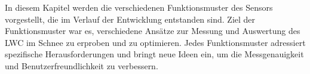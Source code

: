 
In diesem Kapitel werden die verschiedenen Funktionsmuster des Sensors vorgestellt, die im Verlauf der Entwicklung entstanden sind. Ziel der Funktionsmuster war es, verschiedene Ansätze zur Messung und Auswertung des LWC im Schnee zu erproben und zu optimieren. Jedes Funktionsmuster adressiert spezifische Herausforderungen und bringt neue Ideen ein, um die Messgenauigkeit und Benutzerfreundlichkeit zu verbessern.
